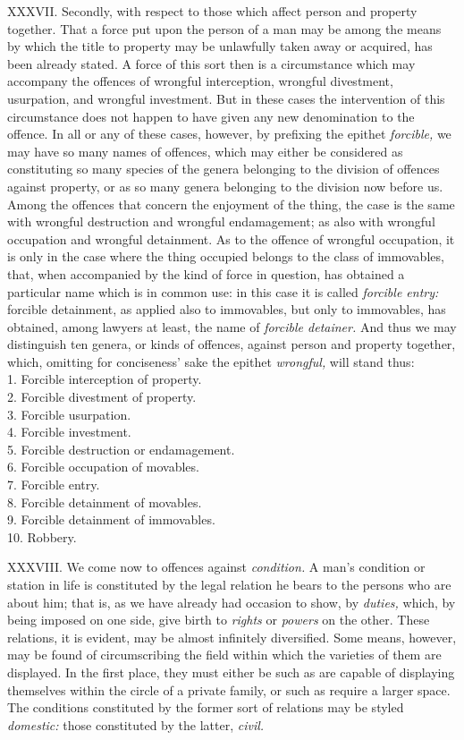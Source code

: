 \documentclass[12pt]{report}
\begin{document}
XXXVII. Secondly, with respect to those which affect person and property
together. That a force put upon the person of a man may be among the
means by which the title to property may be unlawfully taken away or
acquired, has been already stated. A force of this sort then is a
circumstance which may accompany the offences of wrongful interception,
wrongful divestment, usurpation, and wrongful investment. But in these
cases the intervention of this circumstance does not happen to have
given any new denomination to the offence. In all or any of these cases,
however, by prefixing the epithet \emph{forcible,} we may have so many
names of offences, which may either be considered as constituting so
many species of the genera belonging to the division of offences against
property, or as so many genera belonging to the division now before us.
Among the offences that concern the enjoyment of the thing, the case is
the same with wrongful destruction and wrongful endamagement; as also
with wrongful occupation and wrongful detainment. As to the offence of
wrongful occupation, it is only in the case where the thing occupied
belongs to the class of immovables, that, when accompanied by the kind
of force in question, has obtained a particular name which is in common
use: in this case it is called \emph{forcible entry:} forcible
detainment, as applied also to immovables, but only to immovables, has
obtained, among lawyers at least, the name of \emph{forcible detainer.}
And thus we may distinguish ten genera, or kinds of offences, against
person and property together, which, omitting for conciseness' sake the
epithet \emph{wrongful,} will stand thus:\\
1. Forcible interception of property.\\
2. Forcible divestment of property.\\
3. Forcible usurpation.\\
4. Forcible investment.\\
5. Forcible destruction or endamagement.\\
6. Forcible occupation of movables.\\
7. Forcible entry.\\
8. Forcible detainment of movables.\\
9. Forcible detainment of immovables.\\
10. Robbery.

XXXVIII. We come now to offences against \emph{condition.} A man's
condition or station in life is constituted by the legal relation he
bears to the persons who are about him; that is, as we have already had
occasion to show, by \emph{duties,} which, by being imposed on one side,
give birth to \emph{rights} or \emph{powers} on the other. These
relations, it is evident, may be almost infinitely diversified. Some
means, however, may be found of circumscribing the field within which
the varieties of them are displayed. In the first place, they must
either be such as are capable of displaying themselves within the circle
of a private family, or such as require a larger space. The conditions
constituted by the former sort of relations may be styled
\emph{domestic:} those constituted by the latter, \emph{civil.}
\end{document}
